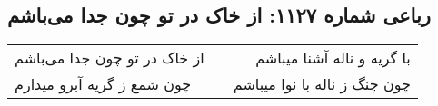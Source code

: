 \begin{center}
\section*{رباعی شماره ۱۱۲۷: از خاک در تو چون جدا می‌باشم}
\label{sec:1127}
\begin{longtable}{l p{0.5cm} r}
از خاک در تو چون جدا می‌باشم
&&
با گریه و ناله آشنا میباشم
\\
چون شمع ز گریه آبرو میدارم
&&
چون چنگ ز ناله با نوا میباشم
\\
\end{longtable}
\end{center}
